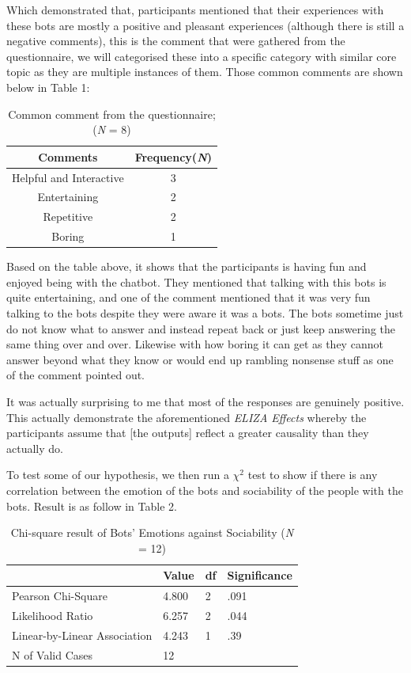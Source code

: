 \documentclass{vgtc}                          %
\begin{document}
Which demonstrated that, participants mentioned that their experiences with these bots are mostly a positive and pleasant experiences (although there is still a negative comments), this is the comment that were gathered from the questionnaire, we will categorised these into a specific category with similar core topic as they are multiple instances of them. Those common comments are shown below in Table 1:

{
\begin{table}[ht]
\centering
\begin{tabular}{|c|c|}
\hline
\textbf{Comments} & \textbf{Frequency}(\textit{N}) \\ \hline
 Helpful and Interactive &  3\\ \hline
 Entertaining &  2\\ \hline
 Repetitive  & 2 \\ \hline
 Boring & 1 \\ \hline
\end{tabular}
\caption{Common comment from the questionnaire; (\textit{N} = 8)}
\label{tab:my-table}
\end{table}
}
Based on the table above, it shows that the participants is having fun and enjoyed being with the chatbot. They mentioned that talking with this bots is quite entertaining, and one of the comment mentioned that it was very fun talking to the bots despite they were aware it was a bots. The bots sometime just do not know what to answer and instead repeat back or just keep answering the same thing over and over. Likewise with how boring it can get as they cannot answer beyond what they know or would end up rambling nonsense stuff as one of the comment pointed out. 

It was actually surprising to me that most of the responses are genuinely positive. This actually demonstrate the aforementioned \textit{ELIZA Effects} whereby the participants assume that [the outputs] reflect a greater causality than they actually do.

To test some of our hypothesis, we then run a $\chi^2$ test to show if there is any correlation between the emotion of the bots and sociability of the people with the bots. Result is as follow in Table 2.
{
\begin{table}[ht]
\centering
\begin{tabular}{llll}
  & \textbf{Value} & \textbf{df} & \textbf{Significance}  \\  \hline
 Pearson Chi-Square & 4.800 & 2 &.091 \\  \hline
 Likelihood Ratio & 6.257 & 2 & .044\\ \hline
 Linear-by-Linear Association & 4.243 & 1 & .39  \\ \hline
 N of Valid Cases &  12 &  & \\  \hline
\end{tabular}
\caption{Chi-square result of Bots' Emotions against Sociability (\textit{N} = 12)}
\label{tab:my-table}
\end{table}
}
\end{document}
